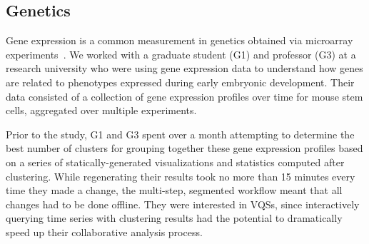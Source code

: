  \subsection{Genetics}
 \par\noindent{} 
 \npar Gene expression is a common measurement in genetics obtained via microarray experiments~\cite{Peng2016}. We worked with a graduate student (G1) and professor (G3) at a research university who were using gene expression data to understand how genes are related to phenotypes expressed during early embryonic development. Their data consisted of a collection of gene expression profiles over time for mouse stem cells, aggregated over multiple experiments.
 \par\noindent{} 
 \npar Prior to the study, G1 and G3 spent over a month attempting to determine the best number of clusters for grouping together these gene expression profiles based on a series of statically-generated visualizations and statistics computed after clustering. While regenerating their results took no more than 15 minutes every time they made a change, the multi-step, segmented workflow meant that all changes had to be done offline. They were interested in VQSs, since interactively querying time series with clustering results had the potential to dramatically speed up their collaborative analysis process.
